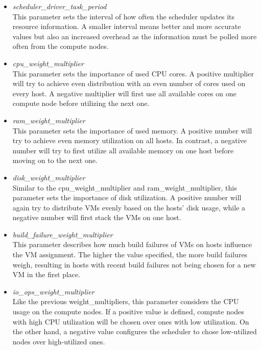         \newpage
        \begin{itemize}
            
            \item \textsl{scheduler\_driver\_task\_period} \hfill \\ 
            This parameter sets the interval of how often the scheduler updates its resource information.
            A smaller interval means better and more accurate values but also an increased overhead as the information must be polled more often from the compute nodes.
            
            \item \textsl{cpu\_weight\_multiplier} \hfill \\ 
            This parameter sets the importance of used \ac{CPU} cores.
            A positive multiplier will try to achieve even distribution with an even number of cores used on every host.
            A negative multiplier will first use all available cores on one compute node before utilizing the next one.
            
            \item \textsl{ram\_weight\_multiplier} \hfill \\ 
            This parameter sets the importance of used memory.
            A positive number will try to achieve even memory utilization on all hosts. In contrast, a negative number will try to first utilize all available memory on one host before moving on to the next one.
            
            \item \textsl{disk\_weight\_multiplier} \hfill \\ 
            Similar to the cpu\_weight\_multiplier and ram\_weight\_multiplier, this parameter sets the importance of disk utilization.
            A positive number will again try to distribute VMs evenly based on the hosts' disk usage, while a negative number will first stack the VMs on one host. 
            
            \item \textsl{build\_failure\_weight\_multiplier} \hfill \\ 
            This parameter describes how much build failures of \acp{VM} on hosts influence the \ac{VM} assignment.
            The higher the value specified, the more build failures weigh, resulting in hosts with recent build failures not being chosen for a new \ac{VM} in the first place.
            
            \item \textsl{io\_ops\_weight\_multiplier} \hfill \\ 
            Like the previous weight\_multipliers, this parameter considers the \ac{CPU} usage on the compute nodes.
            If a positive value is defined, compute nodes with high \ac{CPU} utilization will be chosen over ones with low utilization.
            On the other hand, a negative value configures the scheduler to chose low-utilized nodes over high-utilized ones.
            
        \end{itemize}
        
